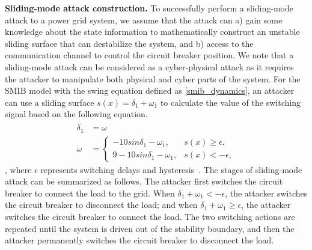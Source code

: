 \vspace{0.5em}
\noindent
{\bf Sliding-mode attack construction.} To successfully perform a sliding-mode attack to a power grid system, we assume that the attack can a) gain some knowledge about the state information to mathematically construct an unstable sliding surface that can destabilize the system, and b) access to the communication channel to control the circuit breaker position. We note that a sliding-mode attack can be considered as a cyber-physical attack as it requires the attacker to manipulate both physical and cyber parts of the system. For the SMIB model with the swing equation defined as \eqref{smib_dynamics}, an attacker can use a sliding surface $s(x) = \delta_1 + \omega_1$ to calculate the value of the switching signal based on the following equation.
%
\begin{align}
\dot{\delta_1} & = \omega \nonumber \\
\dot{\omega} & = 
\begin{cases}
    -10sin\delta_1 - \omega_1, & \text{$s(x) \geq \epsilon$}.\\
    9 - 10sin\delta_1 - \omega_1, & \text{$s(x) < -\epsilon$},
 \end{cases} 
\end{align},
where $\epsilon$ represents switching delays and hysteresis~\cite{liu2011class}.
%
%
The stages of sliding-mode attack can be summarized as follows. The attacker first switches the circuit breaker to connect the load to the grid. When $\delta_1 + \omega_1 < -\epsilon$, the attacker switches the circuit breaker to disconnect the load; and when $\delta_1 + \omega_1 \geq \epsilon$, the attacker switches the circuit breaker to connect the load. The two switching actions are repeated until the system is driven out of the stability boundary, and then the attacker permanently switches the circuit breaker to disconnect the load.
%

